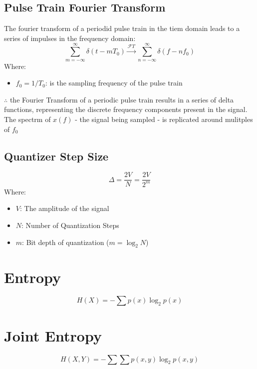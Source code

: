 \documentclass[12pt]{article}
\begin{document}
\subsection{Pulse Train Fourier Transform}
The fourier transform of a periodid pulse train in the tiem domain leads to a series of impulses in the frequency domain:
\[
    \sum_{m=-\infty}^{\infty} \delta(t - m T_0) \xrightarrow{\mathcal{F}T} \sum_{n=-\infty}^{\infty} \delta(f - n f_0)
\]
\noindent Where:
\begin{itemize}
    \item $f_0=1/T_0$: is the sampling frequency of the pulse train
\end{itemize}

\noindent $\therefore$ the Fourier Transform of a periodic pulse train results in a series of delta functions, representing the discrete frequency components present in the signal. The spectrm of $x(f)$ - the signal being sampled - is replicated around mulitples of $f_0$

\subsection{Quantizer Step Size}
\[
    \Delta = \frac{2V}{N} = \frac{2V}{2^m}
\]
\noindent Where:
\begin{itemize}
    \item $V$: The amplitude of the signal
    \item $N$: Number of Quantization Steps
    \item $m$: Bit depth of quantization ($m=\log_2{N}$)
\end{itemize}

\section*{Entropy}
\[
	H(X) = - \sum p(x) \log_2 p(x)
\]

\section*{Joint Entropy}
\[
	H(X,Y) = - \sum \sum p(x,y) \log_2 p(x,y)
\]
\end{document}
